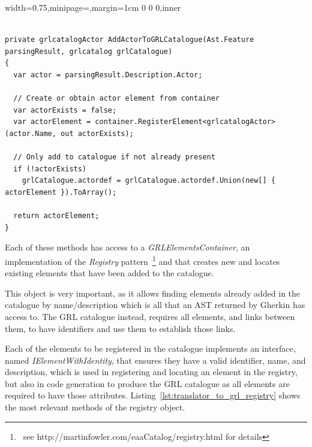 \documentclass[dissertation,final]{softeng}
\newenvironment{featurecode}[1]
{ \lrbox\featurebox \begin{adjustbox}{width=#1\textwidth,minipage=\textwidth,margin=1cm 0 0 0,inner} }
{ \end{adjustbox}\endlrbox}
\newenvironment{featurelist}[2]
{
\newcommand{\setcaption}{\caption{#1}}
\newcommand{\setlabel}{\label{#2}}
}
{\begin{listing}[h!]\centering\usebox\featurebox\setcaption\setlabel\end{listing}}
\begin{document}
\begin{featurelist}{Translator to GRL -- add actor to catalogue}{lst:translator_to_grl_add_actor}
\begin{featurecode}{0.75}
\begin{verbatim}

private grlcatalogActor AddActorToGRLCatalogue(Ast.Feature parsingResult, grlcatalog grlCatalogue)
{
  var actor = parsingResult.Description.Actor;

  // Create or obtain actor element from container
  var actorExists = false;
  var actorElement = container.RegisterElement<grlcatalogActor>(actor.Name, out actorExists);

  // Only add to catalogue if not already present
  if (!actorExists)
    grlCatalogue.actordef = grlCatalogue.actordef.Union(new[] { actorElement }).ToArray();

  return actorElement;
}
\end{verbatim}
\end{featurecode}
\end{featurelist}

Each of these methods has access to a \emph{GRLElementsContainer}, an implementation of the \emph{Registry} pattern~\footnote{~see http://martinfowler.com/eaaCatalog/registry.html for details} and that creates new and locates existing elements that have been added to the catalogue.

This object is very important, as it allows finding elements already added in the catalogue by name/description which is all that an AST returned by Gherkin has access to. The GRL catalogue instead, requires all elements, and links between them, to have identifiers and use them to establish those links.

Each of the elements to be registered in the catalogue implements an interface, named \emph{IElementWithIdentity}, that ensures they have a valid identifier, name, and description, which is used in registering and locating an element in the registry, but also in code generation to produce the GRL catalogue as all elements are required to have those attributes. Listing~\ref{lst:translator_to_grl_registry} shows the most relevant methods of the registry object.
\end{document}
